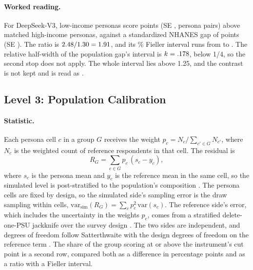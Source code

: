 \paragraph{Worked reading.}
For DeepSeek-V3, low-income personas score \WkLTwoSim{} points (SE \WkLTwoSimSE, \WkLTwoPairs{} persona pairs) above matched high-income personas, against a standardized NHANES gap of \WkLTwoPop{} points (SE \WkLTwoPopSE).
The ratio is $2.48 / 1.30 = 1.91$, and its \WkLTwoLevel\% Fieller interval runs from \WkLTwoLo{} to \WkLTwoHi.
The relative half-width of the population gap's interval is $k = .178$, below 1/4, so the second stop does not apply.
The whole interval lies above 1.25, and the contrast is not kept and is read as . %


\subsection*{Level 3: Population Calibration}
\label{sec:s7-l3}

\paragraph{Statistic.}
Each persona cell $c$ in a group $G$ receives the weight $p_c = N_c / \sum_{c' \in G} N_{c'}$, where $N_c$ is the weighted count of reference respondents in that cell.
The residual is
\begin{equation}
R_G = \sum_{c \in G} p_c\,(s_c - y_c),
\end{equation}
where $s_c$ is the persona mean and $y_c$ is the reference mean in the same cell, so the simulated level is post-stratified to the population's composition \citep{holtsmith1979poststrat}.
The persona cells are fixed by design, so the simulated side's sampling error is the draw sampling within cells, $\mathrm{var}_{\mathrm{sim}}(R_G) = \sum_c p_c^2\,\mathrm{var}(s_c)$.
The reference side's error, which includes the uncertainty in the weights $p_c$, comes from a stratified delete-one-PSU jackknife over the survey design \citep{rustrao1996replication}.
The two sides are independent, and degrees of freedom follow Satterthwaite with the design degrees of freedom on the reference term \citep{satterthwaite1946approximate}.
The share of the group scoring at or above the instrument's cut point is a second row, compared both as a difference in percentage points and as a ratio with a Fieller interval.

